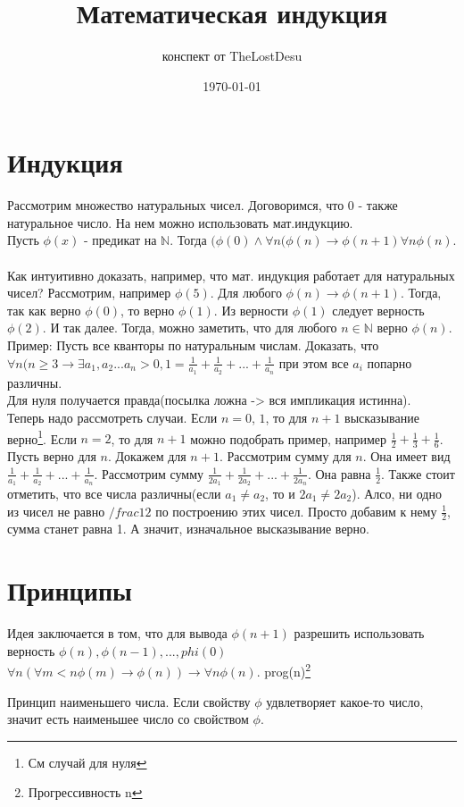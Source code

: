 \documentclass[a4paper,12pt]{article}
\author{конспект от TheLostDesu}
\title{Математическая индукция}
\date{\today}
\begin{document}
\maketitle
\section{Индукция}
Рассмотрим множество натуральных чисел. Договоримся, что 0 - также натуральное число.
На нем можно использовать мат.индукцию. \\
Пусть $\phi (x)$ - предикат на $\mathbb{N}$. Тогда $(\phi (0) \wedge \forall n (\phi(n) \rightarrow \phi (n + 1) \forall n \phi(n)$. \\
\\
Как интуитивно доказать, например, что мат. индукция работает для натуральных чисел?
Рассмотрим, например $\phi(5)$. Для любого $\phi(n) \rightarrow \phi (n + 1)$. Тогда, так как верно $\phi (0)$, то верно $\phi (1)$. Из верности $\phi (1)$ следует верность $\phi (2)$. И так далее. Тогда, можно заметить, что для любого $n \in \mathbb{N}$ верно $\phi (n)$.\\
Пример: Пусть все кванторы по натуральным числам. Доказать, что $\forall n (n \geq 3 \rightarrow \exists a_1, a_2...a_n > 0, 1 = \frac{1}{a_1} + \frac{1}{a_2} + ... + \frac{1}{a_n}$ при этом все $a_i$ попарно различны. \\
Для нуля получается правда(посылка ложна -> вся импликация истинна). \\
Теперь надо рассмотреть случаи. Если $n = 0$, $1$, то для $n + 1$ высказывание верно\footnote{См случай для нуля}. Если $n = 2$, то для $n + 1$ можно подобрать пример, например $\frac{1}{2} + \frac{1}{3} + \frac{1}{6}$. Пусть верно для $n$. Докажем для $n + 1$. Рассмотрим сумму для $n$. Она имеет вид $\frac{1}{a_1} + \frac{1}{a_2} + ... + \frac{1}{a_n}$. Рассмотрим сумму $\frac{1}{2a_1} + \frac{1}{2a_2} +...+ \frac{1}{2a_n}$. Она равна $\frac{1}{2}$. Также стоит отметить, что все числа различны(если $a_1 \neq a_2$, то и $2a_1 \neq 2a_2$). Алсо, ни одно из чисел не равно $/frac{1}{2}$ по построению этих чисел. Просто добавим к нему $\frac{1}{2}$, сумма станет равна 1. А значит, изначальное высказывание верно.

\section{Принципы}
Идея заключается в том, что для вывода $\phi (n + 1)$ разрешить использовать верность $\phi (n), \phi (n - 1), ... , phi(0)$\\
$\forall n(\forall m < n \phi (m) \rightarrow \phi(n)) \rightarrow \forall n \phi(n)$. prog(n)\footnote{Прогрессивность n}

Принцип наименьшего числа. Если свойству $\phi $ удвлетворяет какое-то число, значит есть наименьшее число со свойством $\phi $. 
\end{document}
